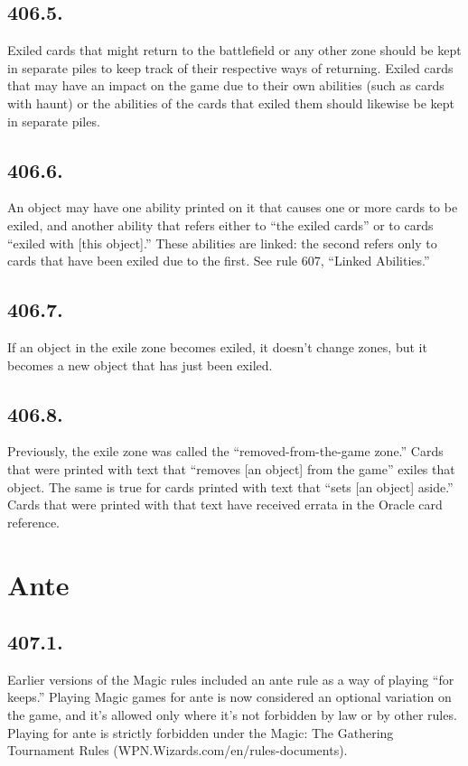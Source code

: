\subsection*{406.5.}
Exiled cards that might return to the battlefield or any other zone should be kept in separate piles to keep track of their respective ways of returning. Exiled cards that may have an impact on the game due to their own abilities (such as cards with haunt) or the abilities of the cards that exiled them should likewise be kept in separate piles.

\subsection*{406.6.}
An object may have one ability printed on it that causes one or more cards to be exiled, and another ability that refers either to “the exiled cards” or to cards “exiled with [this object].” These abilities are linked: the second refers only to cards that have been exiled due to the first. See rule 607, “Linked Abilities.”

\subsection*{406.7.}
If an object in the exile zone becomes exiled, it doesn’t change zones, but it becomes a new object that has just been exiled.

\subsection*{406.8.}
Previously, the exile zone was called the “removed-from-the-game zone.” Cards that were printed with text that “removes [an object] from the game” exiles that object. The same is true for cards printed with text that “sets [an object] aside.” Cards that were printed with that text have received errata in the Oracle card reference.

\section{Ante}
\subsection*{407.1.}
Earlier versions of the Magic rules included an ante rule as a way of playing “for keeps.” Playing Magic games for ante is now considered an optional variation on the game, and it’s allowed only where it’s not forbidden by law or by other rules. Playing for ante is strictly forbidden under the Magic: The Gathering Tournament Rules (WPN.Wizards.com/en/rules-documents).

